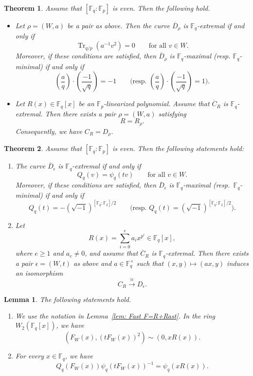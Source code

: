 \documentclass[10pt,a4paper]{amsart}
\newtheorem{lemma}{Lemma}
\newtheorem{theorem}{Theorem}
\def\F{{\mathbb F}}
\DeclareMathOperator{\Tr}{Tr}
\begin{document}
\begin{theorem}\label{t1}
Assume that $[\F_q:\F_p]$ is even. Then the following hold.  
\begin{itemize}
\item[{\rm (i)}]  Let $\rho=(W,a)$ be a pair as above. 
Then the curve $\overline{D}_\rho$ is $\F_q$-extremal if and only if 
\[\Tr_{q/p}(a^{-1}v^2)=0 \qquad\text{for all }v\in W.\]
Moreover, if these conditions are satisfied, then $\overline{D}_\rho$ is $\F_q$-maximal (resp. $\F_q$-minimal) if and only if 
    \[
    \left(\frac{a}{q}\right)\cdot \left(\frac{-1}{\sqrt{q}}\right)=-1 \qquad\text{(resp. }\left(\frac{a}{q}\right)\cdot \left(\frac{-1}{\sqrt{q}}\right)=1). 
    \]
\item[{\rm (ii)}] 

Let $R(x)\in\F_q[x]$ be an $\F_p$-linearized polynomial. Assume that  $\overline{C}_R$ is 
$\F_q$-extremal. Then there exists a pair $\rho=(W,a)$ satisfying 
\[R=R_\rho. \]
Consequently, we have $C_{R}=D_\rho$. 
\end{itemize}
\end{theorem}

\begin{theorem}\label{recipe for ex curve intro}
Assume that $[\F_q:\F_p]$ is even. Then the following statements hold: 
\begin{enumerate}
    \item The curve $\overline{D}_{\epsilon}$ is $\F_q$-extremal if and only if 
    \[
    Q_q(v)=\psi_q(tv)\qquad\text{for all } v\in W. 
    \]
    Moreover, if these conditions are satisfied, then 
    $\overline{D}_{\epsilon}$ is $\F_q$-maximal (resp.\ $\F_q$-minimal) if and only if 
    \[
    Q_q(t)=-(\sqrt{-1})^{[\F_q:\F_2]/2}\qquad\text{(resp.\ }Q_q(t)=(\sqrt{-1})^{[\F_q:\F_2]/2}\text{)}. 
    \]
    \item Let 
\[R(x)=\sum_{i=0}^e a_i x^{p^i} \in 
 \F_q[x],\]
 where $e\geq1$ and $a_e\neq0$, and assume that $\overline{C}_R$ is $\F_q$-extremal. Then there exists a pair $\epsilon=(W,t)$ as above and $a\in\F_q^\times$ such that $(x,y)\mapsto (ax,y)$ induces an isomorphism 
 \[ C_R\xrightarrow{\cong}D_{\epsilon}.
 \]
\end{enumerate}
\end{theorem}

\begin{lemma}\label{lemma: F,tF sim  xRx}
The following statements hold. 
\begin{enumerate}
    \item We use the notation in Lemma~\ref{lem: Fast F=R+Rast}. In the ring $W_2(\F_q[x])$, we have 
    \[
    \left(F_W(x),(tF_W(x))^2\right)\sim (0,xR(x)). 
    \]
    \item For every $x\in \F_q$, we have 
    \[
Q_q(F_W(x))\psi_q(tF_W(x))^{-1}=\psi_q(xR(x)). 
    \]
\end{enumerate}
\end{lemma}
\end{document}
